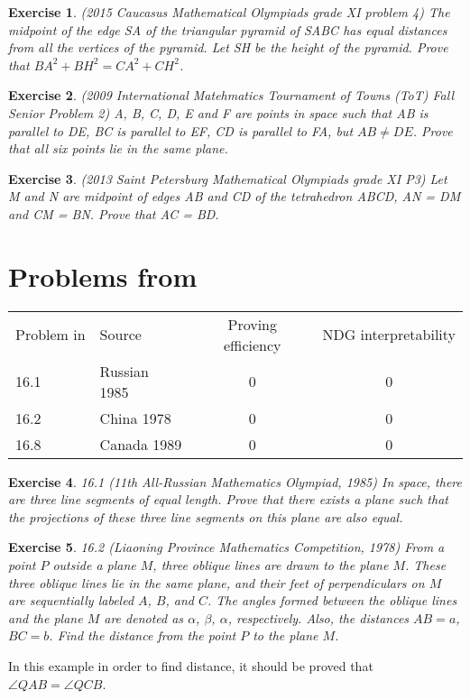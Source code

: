 \documentclass{article}
\newtheorem{z}{Exercise}
\begin{document}
    \begin{z} \textup{(2015 Caucasus Mathematical Olympiads grade XI problem 4)}
        The midpoint of the edge SA of the triangular pyramid of SABC has equal distances  from all the vertices of the 
        pyramid. Let SH be the height of the pyramid. Prove that $BA^2 + BH^2 = CA^2 + CH^2$.
    \end{z}

    \begin{z} \textup{(2009 International Matehmatics Tournament of Towns (ToT) Fall Senior Problem 2)}
        A, B, C, D, E and F are points in space such that AB is parallel to DE, BC is parallel to EF, CD is parallel to FA, 
        but $AB \neq DE$. Prove that all six points lie in the same plane.
    \end{z}

    \begin{z} \textup{(2013 Saint Petersburg Mathematical Olympiads grade XI P3)}
        Let M and N are midpoint of edges AB and CD of the tetrahedron ABCD, AN = DM and CM = BN. Prove that AC = BD.
    \end{z}

\section*{Problems from \cite{}}
    \begin{tabular}{l|l|c|c}
        Problem in \cite{} & Source             & Proving efficiency & NDG interpretability \\
        16.1               & Russian 1985       & 0                  & 0                    \\
        16.2               & China 1978         & 0                  & 0                    \\
        16.8               & Canada 1989        & 0                  & 0                    \\
        \hline
    \end{tabular}
    
    \begin{z} \textup{16.1 (11th All-Russian Mathematics Olympiad, 1985)}
        In space, there are three line segments of equal length. Prove that there exists a plane such that the projections of these three line segments on this plane are also equal.
    \end{z}

    \begin{z} \textup{16.2 (Liaoning Province Mathematics Competition, 1978)}
        From a point $P$ outside a plane $M$, three oblique lines are drawn to the plane $M$. These three oblique lines lie in the same plane, and their feet of perpendiculars on $M$ are sequentially labeled $A$, $B$, and $C$. The angles formed between the oblique lines and the plane $M$ are denoted as $\alpha$, $\beta$, $\alpha$, respectively. Also, the distances $AB = a$, $BC = b$. Find the distance from the point $P$ to the plane $M$. \\
    \end{z}
    In this example in order  to find distance, it should be proved that $\angle QAB = \angle QCB$.
\end{document}
